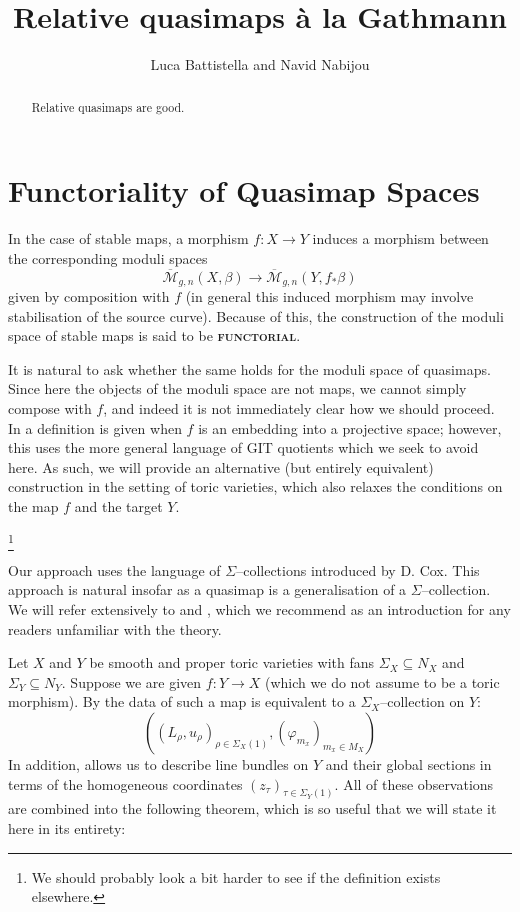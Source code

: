 \documentclass[11pt]{amsart}
\title{Relative quasimaps \`a la Gathmann}
\author{Luca Battistella and Navid Nabijou}
\newcommand{\M}[4]{\overline{\mathcal M}_{#1,#2}(#3,#4)}
\renewcommand{\to}{\rightarrow}
\newcommand{\ildef}[1]{\textbf{\textsc{#1}}}
\theoremstyle{plain}
\theoremstyle{definition}
\begin{document}
\maketitle
\begin{abstract}
Relative quasimaps are good.
\end{abstract}

\section{Functoriality of Quasimap Spaces}

In the case of stable maps, a morphism $f : X \to Y$ induces a morphism between the corresponding moduli spaces
\begin{equation*}\M{g}{n}{X}{\beta} \rightarrow \M{g}{n}{Y}{f_* \beta} \end{equation*}
given by composition with $f$ (in general this induced morphism may involve stabilisation of the source curve). Because of this, the construction of the moduli space of stable maps is said to be \ildef{functorial}.

It is natural to ask whether the same holds for the moduli space of quasimaps. Since here the objects of the moduli space are not maps, we cannot simply compose with $f$, and indeed it is not immediately clear how we should proceed. In \cite[Section 3.1]{CF-K-wallcrossing} a definition is given when $f$ is an embedding into a projective space; however, this uses the more general language of GIT quotients which we seek to avoid here. As such, we will provide an alternative (but entirely equivalent) construction in the setting of toric varieties, which also relaxes the conditions on the map $f$ and the target $Y$.

\footnote{We should probably look a bit harder to see if the definition exists elsewhere.}

Our approach uses the language of $\Sigma$--collections introduced by D. Cox. This approach is natural insofar as a quasimap is a generalisation of a $\Sigma$--collection. We will refer extensively to \cite{CoxRing} and \cite{CoxFunctor}, which we recommend as an  introduction for any readers unfamiliar with the theory.

Let $X$ and $Y$ be smooth and proper toric varieties with fans $\Sigma_X \subseteq N_X$ and $\Sigma_Y \subseteq N_Y$. Suppose we are given $f : Y \to X$ (which we do not assume to be a toric morphism). By \cite[Theorem 1.1]{CoxFunctor} the data of such a map is equivalent to a $\Sigma_X$--collection on $Y$:
\begin{equation*} ( (L_\rho, u_\rho)_{\rho \in \Sigma_X(1)}, (\varphi_{m_x})_{m_x \in M_X} ) \end{equation*}
In addition, \cite{CoxRing} allows us to describe line bundles on $Y$ and their global sections in terms of the homogeneous coordinates $(z_\tau)_{\tau \in \Sigma_Y(1)}$. All of these observations are combined into the following theorem, which is so useful that we will state it here in its entirety:
\end{document}

